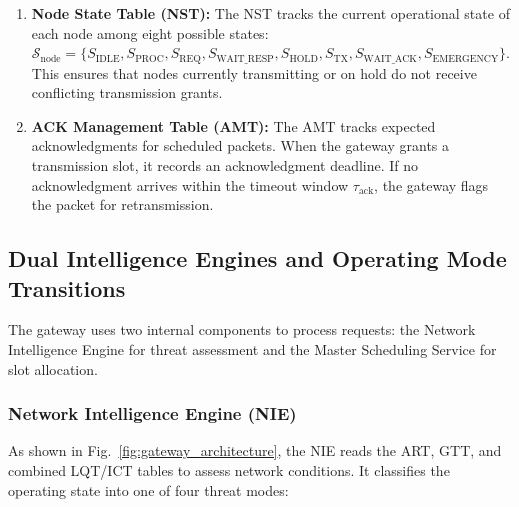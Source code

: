 \documentclass[preprint,review,12pt]{elsarticle}
\begin{document}
\begin{enumerate}
\begin{equation}
    \end{equation}

    where $\Delta t_{\text{guard}} = 5\text{ ms}$.

    \item \textbf{Node State Table (NST):} The NST tracks the current operational state of each node among eight possible states: $\mathcal{S}_{\text{node}} = \{S_{\text{IDLE}}, S_{\text{PROC}}, S_{\text{REQ}}, S_{\text{WAIT\_RESP}}, S_{\text{HOLD}}, S_{\text{TX}}, S_{\text{WAIT\_ACK}}, S_{\text{EMERGENCY}}\}$. This ensures that nodes currently transmitting or on hold do not receive conflicting transmission grants.

    \item \textbf{ACK Management Table (AMT):} The AMT tracks expected acknowledgments for scheduled packets. When the gateway grants a transmission slot, it records an acknowledgment deadline. If no acknowledgment arrives within the timeout window $\tau_{\text{ack}}$, the gateway flags the packet for retransmission.

\end{enumerate}

\subsection{Dual Intelligence Engines and Operating Mode Transitions}

The gateway uses two internal components to process requests: the Network Intelligence Engine for threat assessment and the Master Scheduling Service for slot allocation.

\subsubsection{Network Intelligence Engine (NIE)}

As shown in Fig.~\ref{fig:gateway_architecture}, the NIE reads the ART, GTT, and combined LQT/ICT tables to assess network conditions. It classifies the operating state into one of four threat modes:
\end{document}
